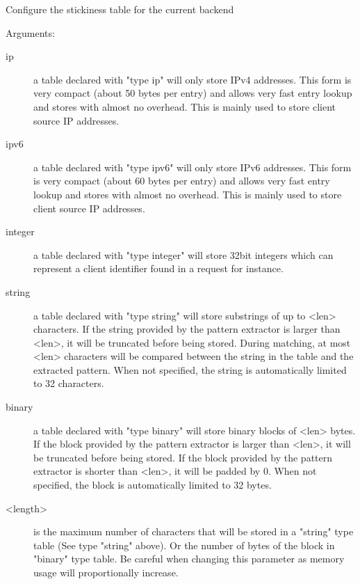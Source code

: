   Configure the stickiness table for the current backend


  Arguments:
  \begin{description}
  \item[ip] a table declared with "type ip" will only store IPv4 addresses.
               This form is very compact (about 50 bytes per entry) and allows
               very fast entry lookup and stores with almost no overhead. This
               is mainly used to store client source IP addresses.

  \item[ipv6] a table declared with "type ipv6" will only store IPv6 addresses.
               This form is very compact (about 60 bytes per entry) and allows
               very fast entry lookup and stores with almost no overhead. This
               is mainly used to store client source IP addresses.

  \item[integer] a table declared with "type integer" will store 32bit integers
               which can represent a client identifier found in a request for
               instance.

  \item[string] a table declared with "type string" will store substrings of up
               to <len> characters. If the string provided by the pattern
               extractor is larger than <len>, it will be truncated before
               being stored. During matching, at most <len> characters will be
               compared between the string in the table and the extracted
               pattern. When not specified, the string is automatically limited
               to 32 characters.

  \item[binary] a table declared with "type binary" will store binary blocks
               of <len> bytes. If the block provided by the pattern
               extractor is larger than <len>, it will be truncated before
               being stored. If the block provided by the pattern extractor
               is shorter than <len>, it will be padded by 0. When not
               specified, the block is automatically limited to 32 bytes.

  \item[<length>] is the maximum number of characters that will be stored in a
               "string" type table (See type "string" above). Or the number
               of bytes of the block in "binary" type table. Be careful when
               changing this parameter as memory usage will proportionally
               increase.


\end{description}
